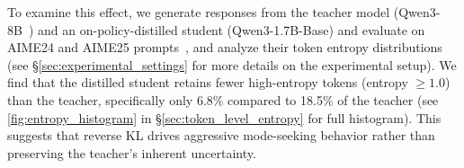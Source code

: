 To examine this effect, we generate responses from the teacher model (Qwen3-8B~\cite{yang2025qwen3}) and an on-policy-distilled student (Qwen3-1.7B-Base) and evaluate on AIME24 and AIME25 prompts~\cite{maa_aime}, and analyze their token entropy distributions (see \S\ref{sec:experimental_settings} for more details on the experimental setup).
We find that the distilled student retains fewer high-entropy tokens (entropy $\geq 1.0$) than the teacher, specifically only 6.8\% compared to 18.5\% of the teacher (see \autoref{fig:entropy_histogram} in \S\ref{sec:token_level_entropy} for full histogram).
This suggests that reverse KL drives aggressive mode-seeking behavior rather than preserving the teacher's inherent uncertainty. 



